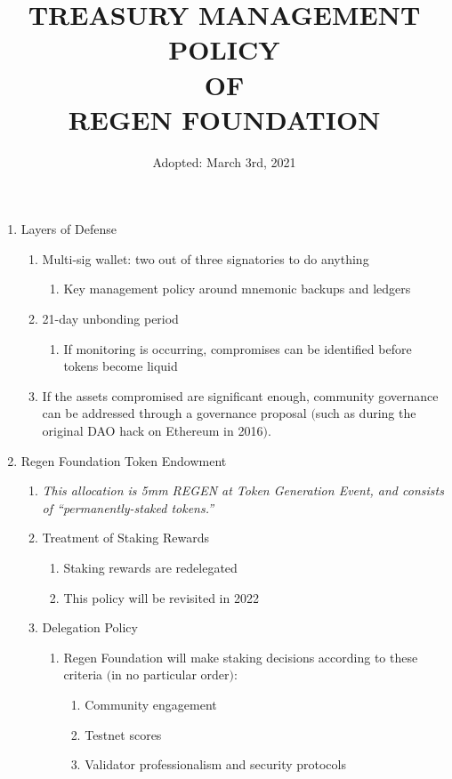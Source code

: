 \documentclass{article}
\begin{document}
\title{TREASURY MANAGEMENT POLICY \protect\\ OF \protect\\ REGEN FOUNDATION}
\author{Adopted: March 3rd, 2021}
\date{} 
\maketitle
\begin{enumerate}
\item Layers of Defense
\begin{enumerate}
\item Multi-sig wallet: two out of three signatories to do anything
\begin{enumerate}
\item Key management policy around mnemonic backups and ledgers
\end{enumerate}
\item 21-day unbonding period
\begin{enumerate}
\item If monitoring is occurring, compromises can be identified before tokens become liquid
\end{enumerate}
\item If the assets compromised are significant enough, community governance can be addressed through a governance proposal $($such as during the original DAO hack on Ethereum in 2016$)$.
\end{enumerate}
\item Regen Foundation Token Endowment
\begin{enumerate}
\item {\it This allocation is 5mm REGEN at Token Generation Event, and consists of “permanently-staked tokens.”}
\item Treatment of Staking Rewards
\begin{enumerate}
\item Staking rewards are redelegated
\item This policy will be revisited in 2022
\end{enumerate}
\item Delegation Policy
\begin{enumerate}
\item Regen Foundation will make staking decisions according to these criteria $($in no particular order$)$:
\begin{enumerate}
\item Community engagement
\item Testnet scores
\item Validator professionalism and security protocols

\end{enumerate}
\end{enumerate}
\end{enumerate}
\end{enumerate}
\end{document}
